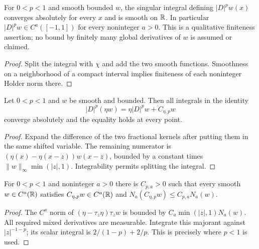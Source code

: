 \begin{lemma}
  \label{lem:c12_frac_local_finite}
  For $0<p<1$ and smooth bounded $w$, the singular integral defining $|D|^pw(x)$
  converges absolutely for every $x$ and is smooth on $\mathbb{R}$.
  In particular $|D|^pw\in C^a([-1,1])$ for every noninteger $a>0$.
  This is a qualitative finiteness assertion; no bound by finitely many global derivatives
  of $w$ is assumed or claimed.
\end{lemma}
\begin{proof}
  Split the integral with $\chi$ and add the two smooth functions. Smoothness on a neighborhood
  of a compact interval implies finiteness of each noninteger Holder norm there.
\end{proof}

\begin{lemma}
  \label{lem:c12_commutator_identity}
  Let $0<p<1$ and $w$ be smooth and bounded. Then all integrals in the identity
  \[
    |D|^p(\eta w)=\eta|D|^pw+C_{\eta,p}w
  \]
  converge absolutely and the equality holds at every point.
\end{lemma}
\begin{proof}
  Expand the difference of the two fractional kernels after putting them in the same shifted
  variable. The remaining numerator is $(\eta(x)-\eta(x-z))w(x-z)$, bounded by a constant
  times $\|w\|_\infty\min(|z|,1)$. Integrability permits splitting the integral.
\end{proof}

\begin{lemma}
  \label{lem:c12_commutator_norm}
  For $0<p<1$ and noninteger $a>0$ there is $C_{p,a}>0$ such that every smooth
  $w\in C^a(\mathbb{R})$ satisfies $C_{\eta,p}w\in C^a(\mathbb{R})$ and
  $N_a(C_{\eta,p}w)\le C_{p,a}N_a(w)$.
\end{lemma}
\begin{proof}
  The $C^a$ norm of $(\eta-\tau_z\eta)\tau_z w$ is bounded by
  $C_a\min(|z|,1)N_a(w)$. All required mixed derivatives are measurable.
  Integrate this majorant against $|z|^{-1-p}$; its scalar integral is
  $2/(1-p)+2/p$. This is precisely where $p<1$ is used.
\end{proof}

